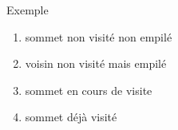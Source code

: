 \documentclass[10pt]{beamer}
\begin{document}
\begin{frame}{Exemple}
\begin{enumerate}[--]
    \item \color{graphautre} sommet non visité non empilé
	\item \color{graphviolet} voisin non visité mais empilé
    \item \color{graphrouge} sommet en cours de visite
    \item \color{graphbleu} sommet déjà visité
\end{enumerate}


\end{frame}
\end{document}
